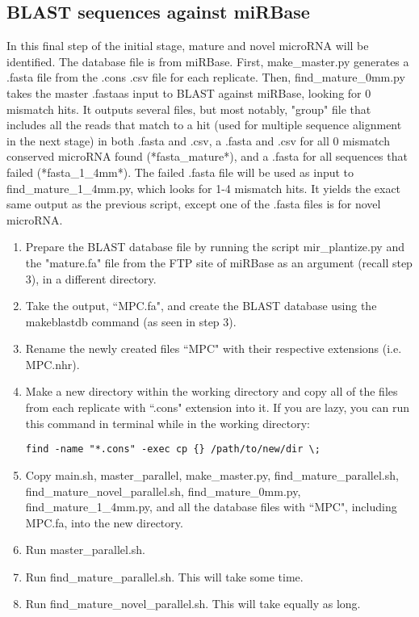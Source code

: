 \documentclass[12pt,titlepage]{article}
\begin{document}
\subsection{BLAST sequences against miRBase}
In this final step of the initial stage, mature and novel microRNA will be identified. The database file is from miRBase. First, make\_master.py generates a .fasta file from the .cons .csv file for each replicate. Then, find\_mature\_0mm.py takes the master .fastaas input to BLAST against miRBase, looking for 0 mismatch hits. It outputs several files, but most notably, "group" file that includes all the reads that match to a hit (used for multiple sequence alignment in the next stage) in both .fasta and .csv, a .fasta and .csv for all 0 mismatch conserved microRNA found (*fasta\_mature*), and a .fasta for all sequences that failed (*fasta\_1\_4mm*). The failed .fasta file will be used as input to find\_mature\_1\_4mm.py, which looks for 1-4 mismatch hits. It yields the exact same output as the previous script, except one of the .fasta files is for novel microRNA.
\begin{enumerate}
\item Prepare the BLAST database file by running the script mir\_plantize.py and the "mature.fa" file from the FTP site of miRBase as an argument (recall step 3), in a different directory.
\item Take the output, ``MPC.fa", and create the BLAST database using the makeblastdb command (as seen in step 3).
\item Rename the newly created files ``MPC" with their respective extensions (i.e. MPC.nhr).
\item Make a new directory within the working directory and copy all of the files from each replicate with ``.cons" extension into it. If you are lazy, you can run this command in terminal while in the working directory: 
\begin{tcolorbox}
\begin{lstlisting}
find -name "*.cons" -exec cp {} /path/to/new/dir \; 
\end{lstlisting}
\end{tcolorbox}
\item Copy main.sh, master\_parallel, make\_master.py, find\_mature\_parallel.sh, find\_mature\_novel\_parallel.sh, find\_mature\_0mm.py, find\_mature\_1\_4mm.py, and all the database files with ``MPC", including MPC.fa, into the new directory.
\item Run master\_parallel.sh.
\item Run find\_mature\_parallel.sh. This will take some time.
\item Run find\_mature\_novel\_parallel.sh. This will take equally as long.
\end{enumerate}
\end{document}
